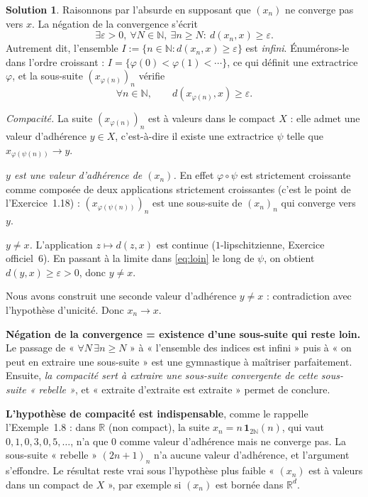 \documentclass[11pt,a4paper]{article}
\newcommand{\R}{\mathbb{R}}
\newcommand{\N}{\mathbb{N}}
\newcommand{\ie}{c'est-à-dire}
\theoremstyle{definition}
\newtheorem*{solution}{Solution}
\begin{document}
\begin{solution}
Raisonnons par l'absurde en supposant que $(x_n)$ ne converge pas vers $x$. La négation de la convergence s'écrit
\[
\exists\varepsilon>0,\ \forall N\in\N,\ \exists n\ge N :\ d(x_n,x)\ge\varepsilon .
\]
Autrement dit, l'ensemble $I:=\{n\in\N : d(x_n,x)\ge\varepsilon\}$ est \emph{infini}. Énumérons-le dans l'ordre croissant : $I=\{\varphi(0)<\varphi(1)<\cdots\}$, ce qui définit une extractrice $\varphi$, et la sous-suite $(x_{\varphi(n)})_n$ vérifie
\begin{equation}\label{eq:loin}
\forall n\in\N,\qquad d(x_{\varphi(n)},x)\ge\varepsilon .
\end{equation}

\emph{Compacité.} La suite $(x_{\varphi(n)})_n$ est à valeurs dans le compact $X$ : elle admet une valeur d'adhérence $y\in X$, \ie{} il existe une extractrice $\psi$ telle que $x_{\varphi(\psi(n))}\to y$.

\emph{$y$ est une valeur d'adhérence de $(x_n)$.} En effet $\varphi\circ\psi$ est strictement croissante comme composée de deux applications strictement croissantes (c'est le point de l'Exercice~1.18) : $(x_{\varphi(\psi(n))})_n$ est une sous-suite de $(x_n)_n$ qui converge vers $y$.

\emph{$y\ne x$.} L'application $z\mapsto d(z,x)$ est continue ($1$-lipschitzienne, Exercice officiel~6). En passant à la limite dans \eqref{eq:loin} le long de $\psi$, on obtient $d(y,x)\ge\varepsilon>0$, donc $y\ne x$.

Nous avons construit une seconde valeur d'adhérence $y\ne x$ : contradiction avec l'hypothèse d'unicité. Donc $x_n\to x$.
\end{solution}

\begin{pointcle}
\textbf{Négation de la convergence = existence d'une sous-suite qui reste loin.} Le passage de « $\forall N\,\exists n\ge N$ » à « l'ensemble des indices est infini » puis à « on peut en extraire une sous-suite » est une gymnastique à maîtriser parfaitement. Ensuite, \emph{la compacité sert à extraire une sous-suite convergente de cette sous-suite « rebelle »}, et « extraite d'extraite est extraite » permet de conclure.
\end{pointcle}

\begin{piege}
\textbf{L'hypothèse de compacité est indispensable}, comme le rappelle l'Exemple~1.8 : dans $\R$ (non compact), la suite $x_n=n\,\mathbf 1_{2\N}(n)$, qui vaut $0,1,0,3,0,5,\dots$, n'a que $0$ comme valeur d'adhérence mais ne converge pas. La sous-suite « rebelle » $(2n+1)_n$ n'a aucune valeur d'adhérence, et l'argument s'effondre. Le résultat reste vrai sous l'hypothèse plus faible « $(x_n)$ est à valeurs dans un compact de $X$ », par exemple si $(x_n)$ est bornée dans $\R^d$.
\end{piege}
\end{document}
